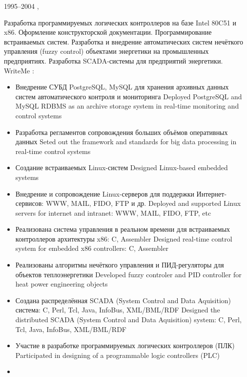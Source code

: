 \documentclass[11pt,a4paper,sans]{moderncv}        %
\begin{document}
\cventry
{1995--2004}
{\leadsoftdeveloper}
{\protect{}}
{\citykirov, \country}{}
{
{Разработка программируемых логических контроллеров на базе Intel 80C51 и x86. Оформление конструкторской документации. Программирование встраиваемых систем. Разработка и внедрение автоматических систем нечёткого управления (fuzzy control) объектами энергетики на промышленных предприятиях. Разработка SCADA-системы для предприятий энергетики.}
{WriteMe}
\newline{}
\achievements:
\begin{itemize}
	\item {}
		{Внедрение СУБД PostgreSQL, MySQL для хранения архивных данных систем автоматического контроля и мониторинга}
		{Deployed PostgreSQL and MySQL RDBMS as an archive storage system in real-time monitoring and control systems}
	\item {}
		{Разработка регламентов сопровождения больших объёмов оперативных данных}
		{Seted out the framework and standards for big data processing in real-time control systems}
	\item {}
		{Создание встраиваемых Linux-систем}
		{Designed Linux-based embedded systems}
	\item {}
		{Внедрение и сопровождение Linux-серверов для поддержки Интернет-сервисов: WWW, MAIL, FIDO, FTP и др.}
		{Deployed and supported Linux servers for internet and intranet: WWW, MAIL, FIDO, FTP, etc}
	\item {}
		{Реализована система управления в реальном времени для встраиваемых контроллеров архитектуры x86: C, Assembler}
		{Designed real-time control system for embedded x86 controllers: C, Assembler}
	\item {}
		{Реализованы алгоритмы нечёткого управления и ПИД-регуляторы для объектов теплоэнергетики}
		{Developed fuzzy controler and PID controller for heat power engineering objects}
	\item {}
		{Создана распределённая SCADA (System Control and Data Aquisition) система: C, Perl, Tcl, Java, InfoBus, XML/BML/RDF}
		{Designed the distributed SCADA (System Control and Data Aquisition) system: C, Perl, Tcl, Java, InfoBus, XML/BML/RDF }
	\item {}
		{Участие в разработке программируемых логических контроллеров (ПЛК)}
		{Participated in designing of a programmable logic controllers (PLC)}
	\item {}

\end{itemize}}
\end{document}
